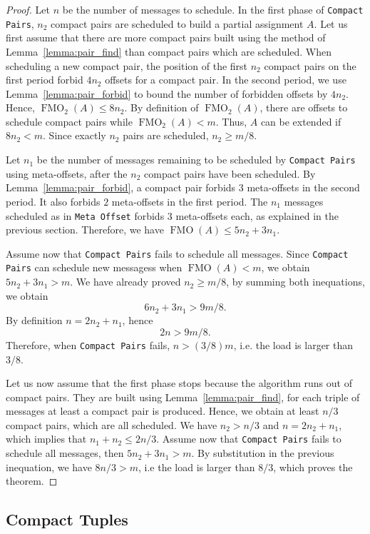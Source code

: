 \documentclass[a4paper,UKenglish,cleveref, autoref, thm-restate]{lipics-v2019}
\DeclareMathOperator{\Fmo}{FMO}
\newcommand\compactpair{\texttt{Compact Pairs}\xspace}
\newcommand\metaoffset{\texttt{Meta Offset}\xspace}
\begin{document}
\begin{proof}
Let $n$ be the number of messages to schedule.
In the first phase of \compactpair, $n_2$ compact pairs are scheduled to build a partial assignment $A$. Let us first assume that there are more compact pairs built 
using the method of Lemma~\ref{lemma:pair_find} than compact pairs which are scheduled.
When scheduling a new compact pair, the position of the first $n_2$ compact pairs on the first period forbid $4n_2$ offsets for a compact pair. In the second period, we use Lemma~\ref{lemma:pair_forbid} to bound the number of forbidden offsets by $4n_2$.   
Hence, $\Fmo_2(A) \leq 8n_2$. By definition of $\Fmo_2(A)$, there are offsets to schedule compact pairs while $\Fmo_2(A) < m$. Thus, $A$ can be extended if $8n_2 < m$.
Since exactly $n_2$ pairs are scheduled, $n_2 \geq m/8$.  

Let $n_1$ be the number of messages remaining to be scheduled by \compactpair using meta-offsets, after the $n_2$ compact pairs have been scheduled. By Lemma~\ref{lemma:pair_forbid}, a compact pair forbids $3$ meta-offsets in the second period. It also forbids $2$ meta-offsets in the first period. The $n_1$ messages scheduled as in \metaoffset forbids $3$ meta-offsets each, as explained in the previous section.
Therefore, we have $\Fmo(A) \leq 5n_2 + 3n_1$. 

Assume now that \compactpair fails to schedule all messages.
Since \compactpair can schedule new messagess when $\Fmo(A) < m$, 
we obtain $5n_2 + 3n_1 > m$. We have already proved $n_2 \geq  m/8$, by summing both inequations, we obtain $$6n_2 + 3n_1 > 9m/8.$$ By definition $n = 2n_2 + n_1$, hence $$2n > 9m/8.$$ Therefore, when \compactpair fails, $n > (3/8)m$, i.e. the load is larger than $3/8$.

Let us now assume that the first phase stops because the algorithm runs out of compact pairs. They are built using Lemma~\ref{lemma:pair_find}, for each triple of messages at least a compact pair is produced. Hence, we obtain at least $n/3$ compact pairs, which are all scheduled. We have $n_2 > n/3$ and $n= 2n_2 + n_1$, which implies that $n_1 + n_2 \leq 2n/3$.
Assume now that \compactpair fails to schedule all messages, then $5n_2 + 3n_1 > m$.
By substitution in the previous inequation, we have $ 8n/3  > m$, i.e the load is larger than $8/3$, which proves the theorem.
\end{proof}



\subsection{Compact Tuples}\label{sec:compact}
\end{document}
